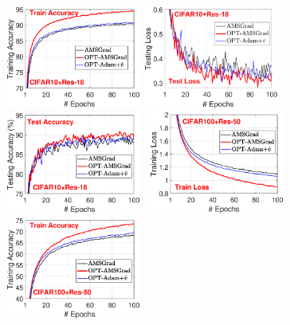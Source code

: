 \documentclass[twoside]{article}
\begin{document}
\begin{figure}
{\includegraphics[width=1.75in]{new_figure/cifar10_train_acc_disz.eps}\hspace{-0.12in}
\includegraphics[width=1.75in]{new_figure/cifar10_test_loss_disz.eps}\hspace{-0.12in}
\includegraphics[width=1.75in]{new_figure/cifar10_test_acc_disz.eps}
}
\mbox{\hspace{-0.1in}
\includegraphics[width=1.75in]{new_figure/cifar100_train_loss_disz.eps}\hspace{-0.12in}
\includegraphics[width=1.75in]{new_figure/cifar100_train_acc_disz.eps}\hspace{-0.12in}
}
\end{figure}
\end{document}
